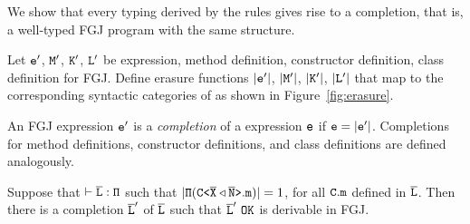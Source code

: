 We show that every typing derived by the \TFGJ rules gives rise to a
completion, that is, a well-typed FGJ program with the same structure.
\begin{definition}[Erasure]\label{def:erasure}
  Let ${\tt e}'$, ${\tt M}'$, ${\tt K}'$, ${\tt L}'$ be expression, method definition, constructor definition, class definition for FGJ. Define erasure functions 
  $|{\tt e}'|$, $|{\tt M}'|$, $|{\tt K}'|$,
  $|{\tt L}'|$ that map to the corresponding syntactic categories
  of \TFGJ as shown in Figure~\ref{fig:erasure}.
  \end{definition}
\begin{definition}[Completion]\label{def:completion}
  An FGJ expression ${\tt e}'$ is a \emph{completion} of a \TFGJ expression ${\tt e}$ if ${\tt e} = |{\tt e}'|$. Completions for method definitions, constructor definitions, and class definitions
  are defined analogously.
\end{definition}
\begin{theorem}
  Suppose that $\mathtt{\vdash \overline{\tt L} : \Pi}$ such that $|\mathtt{\Pi (\mathtt{C \texttt{<} \overline{\tt X} \triangleleft \overline{\tt N} \texttt{>} }.m)}| = 1$, for all ${\tt C.m}$ defined in $\overline{\tt L}$. Then there is a completion $\overline{\tt L}'$ of $\overline{\tt L}$ such that
  $\ol{L}'\ \mathtt{OK}$ is derivable in FGJ. 
\end{theorem}

